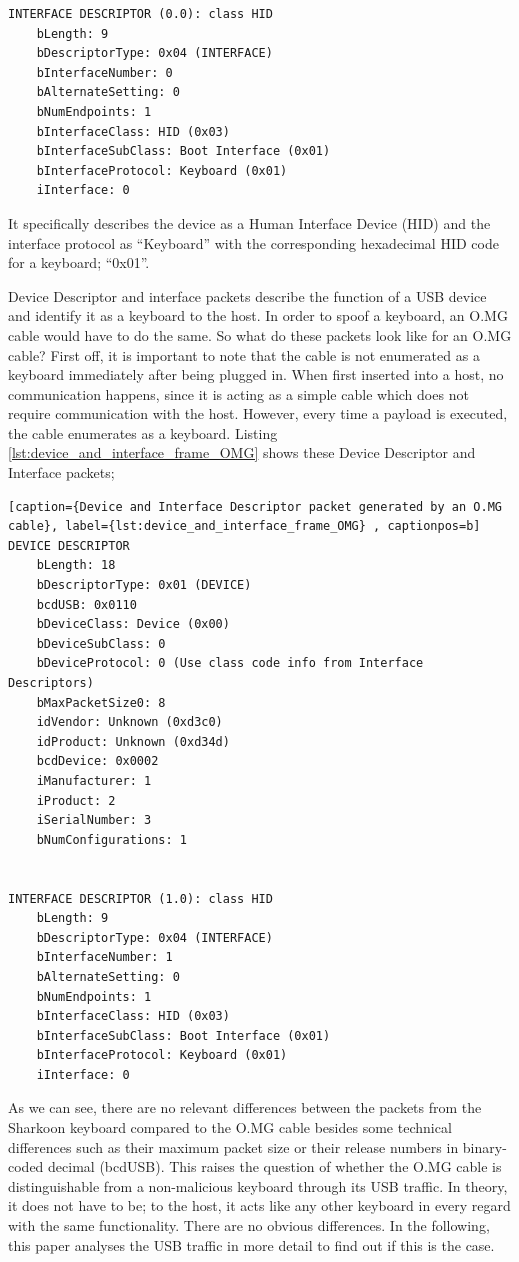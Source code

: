 \begin{lstlisting}[caption={Interface Descriptor packet generated by an external keyboard}, label={lst:interface_descriptor_frame}, captionpos=b]
INTERFACE DESCRIPTOR (0.0): class HID
    bLength: 9
    bDescriptorType: 0x04 (INTERFACE)
    bInterfaceNumber: 0
    bAlternateSetting: 0
    bNumEndpoints: 1
    bInterfaceClass: HID (0x03)
    bInterfaceSubClass: Boot Interface (0x01)
    bInterfaceProtocol: Keyboard (0x01)
    iInterface: 0
\end{lstlisting}

It specifically describes the device as a Human Interface Device (HID) and the interface protocol as ``Keyboard'' with the corresponding hexadecimal HID code for a keyboard; ``0x01''.

Device Descriptor and interface packets describe the function of a USB device and identify it as a keyboard to the host. In order to spoof a keyboard, an O.MG cable would have to do the same. So what do these packets look like for an O.MG cable?
First off, it is important to note that the cable is not enumerated as a keyboard immediately after being plugged in. When first inserted into a host, no communication happens, since it is acting as a simple cable which does not require communication with the host. However, every time a payload is executed, the cable enumerates as a keyboard.
Listing \ref{lst:device_and_interface_frame_OMG} shows these Device Descriptor and Interface packets;

\begin{lstlisting}[caption={Device and Interface Descriptor packet generated by an O.MG cable}, label={lst:device_and_interface_frame_OMG} , captionpos=b]
DEVICE DESCRIPTOR
    bLength: 18
    bDescriptorType: 0x01 (DEVICE)
    bcdUSB: 0x0110
    bDeviceClass: Device (0x00)
    bDeviceSubClass: 0
    bDeviceProtocol: 0 (Use class code info from Interface Descriptors)
    bMaxPacketSize0: 8
    idVendor: Unknown (0xd3c0)
    idProduct: Unknown (0xd34d)
    bcdDevice: 0x0002
    iManufacturer: 1
    iProduct: 2
    iSerialNumber: 3
    bNumConfigurations: 1


INTERFACE DESCRIPTOR (1.0): class HID
    bLength: 9
    bDescriptorType: 0x04 (INTERFACE)
    bInterfaceNumber: 1
    bAlternateSetting: 0
    bNumEndpoints: 1
    bInterfaceClass: HID (0x03)
    bInterfaceSubClass: Boot Interface (0x01)
    bInterfaceProtocol: Keyboard (0x01)
    iInterface: 0
\end{lstlisting}

As we can see, there are no relevant differences between the packets from the Sharkoon keyboard compared to the O.MG cable besides some technical differences such as their maximum packet size or their release numbers in binary-coded decimal (bcdUSB). This raises the question of whether the O.MG cable is distinguishable
from a non-malicious keyboard through its USB traffic. In theory, it does not have to be; to the host, it acts like any other keyboard in every regard with the same functionality. There are no obvious differences. In the following, this paper analyses the USB traffic in more detail to find out if this is the case.


